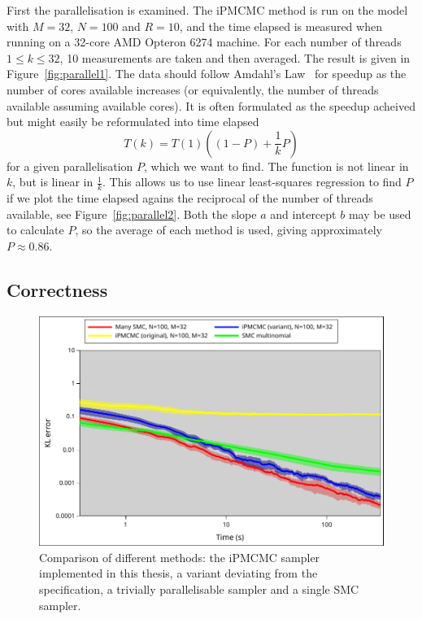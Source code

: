 First the parallelisation is examined. The iPMCMC method is run on the model with $M=32$, $N=100$ and $R=10$, and the time elapsed is measured when running on a 32-core AMD Opteron 6274 machine. For each number of threads $1 \leq k \leq 32$, 10 measurements are taken and then averaged. The result is given in Figure~\ref{fig:parallel1}. The data should follow Amdahl's Law~\cite{amdahl} for speedup as the number of cores available increases (or equivalently, the number of threads available assuming available cores). It is often formulated as the speedup acheived but might easily be reformulated into time elapsed
\begin{equation}\label{eq:amdahl}
    T(k) = T(1)\left((1-P) + \frac 1 k P\right)
\end{equation}
for a given parallelisation $P$, which we want to find. The function is not linear in $k$, but is linear in $\frac 1 k$. This allows us to use linear least-squares regression to find $P$ if we plot the time elapsed agains the reciprocal of the number of threads available, see Figure~\ref{fig:parallel2}. Both the slope $a$ and intercept $b$ may be used to calculate $P$, so the average of each method is used, giving approximately $P \approx 0.86$.

\subsection{Correctness}
\label{sub:correctness}

\begin{figure}[h]
    \centering
    \includegraphics[width=\linewidth]{figures/correctness.pdf}
    \caption{Comparison of different methods: the \mbox{iPMCMC} sampler implemented in this thesis, a variant deviating from the specification, a trivially parallelisable sampler and a single SMC sampler.}
    \label{fig:corr}
\end{figure}

